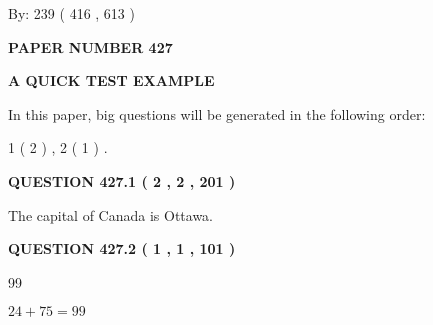\documentclass[12pt]{article}
\begin{document}
   
\hspace{1.0in} By: 
 239 ( 416 ,  613 )
   
   
   
   
\newpage 
\setcounter{page}{ 
   427001 } 
   
   
   
   
 {\textbf{ \Large{ PAPER NUMBER  427  }}}
   
   
\vspace{0.2in}
   
   
   
   
   
   
 \vspace{0.2in}
{\LARGE {\textbf{ A QUICK TEST EXAMPLE}}}
   
   
   
\vspace{0.2in}
   
In this paper, big questions will be generated in the following order: 
   
   
   1 ( 2 )
 ,
   2 ( 1 )
 .
  
\vspace{0.2in}
  
{\textbf{\Large{QUESTION
427.1 
 ( 2 , 2 , 201 )
}}}
  
  
 
 
\noindent{}
 
 
The capital of Canada is Ottawa.
 
 
 
 
  
\vspace{0.2in}
  
{\textbf{\Large{QUESTION
427.2 
 ( 1 , 1 , 101 )
}}}
  
  
 
 
\noindent{}

99
 
 
 
 
\noindent{}

$ %
24 +  %
75=   %
99$
 
 
   
   
 \vspace{0.2in}
 
\end{document}
